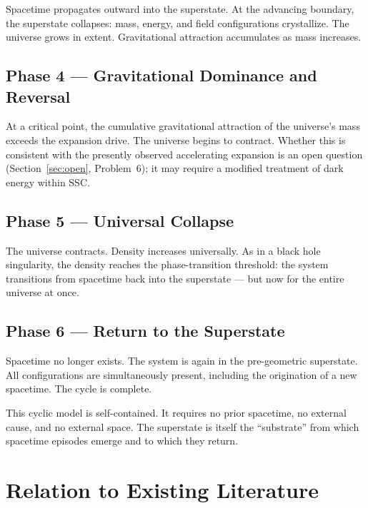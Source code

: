 \documentclass[12pt,a4paper]{article}
\begin{document}
Spacetime propagates outward into the superstate.  At the advancing
boundary, the superstate collapses: mass, energy, and field
configurations crystallize.  The universe grows in extent.
Gravitational attraction accumulates as mass increases.

\subsection*{Phase 4 — Gravitational Dominance and Reversal}

At a critical point, the cumulative gravitational attraction of the
universe's mass exceeds the expansion drive.  The universe begins to
contract.  Whether this is consistent with the presently observed
accelerating expansion is an open question (Section~\ref{sec:open},
Problem~6); it may require a modified treatment of dark energy within
SSC.

\subsection*{Phase 5 — Universal Collapse}

The universe contracts.  Density increases universally.  As in a black
hole singularity, the density reaches the phase-transition threshold:
the system transitions from spacetime back into the superstate — but
now for the entire universe at once.

\subsection*{Phase 6 — Return to the Superstate}

Spacetime no longer exists.  The system is again in the pre-geometric
superstate.  All configurations are simultaneously present, including
the origination of a new spacetime.  The cycle is complete.

\bigskip
\noindent
This cyclic model is self-contained.  It requires no prior spacetime,
no external cause, and no external space.  The superstate is itself the
``substrate'' from which spacetime episodes emerge and to which they
return.

\section{Relation to Existing Literature}
\label{sec:related}
\end{document}
